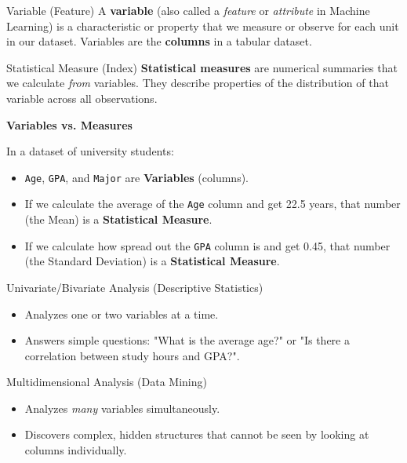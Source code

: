 \begin{defbox}{Variable (Feature)}
 A \textbf{variable} (also called a \textit{feature} or \textit{attribute} in Machine Learning) is a characteristic or property that we measure or observe for each unit in our dataset. Variables are the \textbf{columns} in a tabular dataset.
\end{defbox}

\begin{defbox}{Statistical Measure (Index)}
 \textbf{Statistical measures} are numerical summaries that we calculate \textit{from} variables. They describe properties of the distribution of that variable across all observations.
\end{defbox}

\vspace{0.1cm}
\begin{example}{\textbf{Variables vs. Measures}}

In a dataset of university students:
\begin{itemize}
    \item \texttt{Age}, \texttt{GPA}, and \texttt{Major} are \textbf{Variables} (columns).
    \item If we calculate the average of the \texttt{Age} column and get 22.5 years, that number (the Mean) is a \textbf{Statistical Measure}.
    \item If we calculate how spread out the \texttt{GPA} column is and get 0.45, that number (the Standard Deviation) is a \textbf{Statistical Measure}.
\end{itemize}
\end{example}

\vspace{0.3cm}

\begin{defbox}{Univariate/Bivariate Analysis (Descriptive Statistics)}
\begin{itemize}
    \item Analyzes one or two variables at a time.
    \item Answers simple questions: "What is the average age?" or "Is there a correlation between study hours and GPA?".
\end{itemize}
\end{defbox}

\pagebreak
\begin{defbox}{Multidimensional Analysis (Data Mining)}
\begin{itemize}
    \item Analyzes \textit{many} variables simultaneously.
    \item Discovers complex, hidden structures that cannot be seen by looking at columns individually.
\end{itemize}
\end{defbox}

